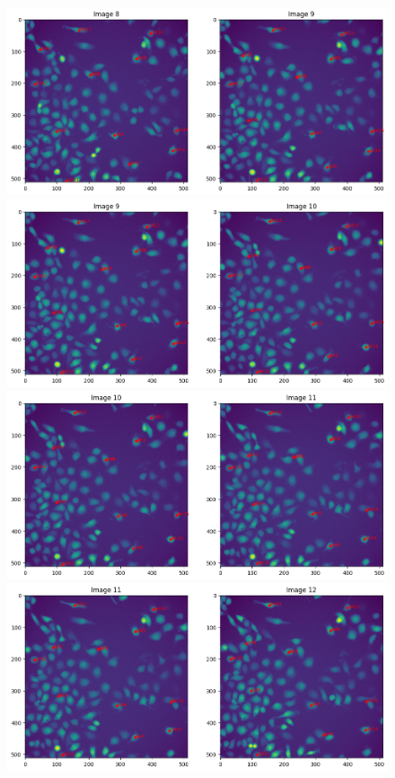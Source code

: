 \documentclass{article}
\begin{document}
\begin{figure}[h!]
\centering
\includegraphics[width=0.75\linewidth]{Report/RImages/Traces_Control/image_9a.png}
\includegraphics[width=0.75\linewidth]{Report/RImages/Traces_Control/image_10a.png}
\includegraphics[width=0.75\linewidth]{Report/RImages/Traces_Control/image_11a.png}
\includegraphics[width=0.75\linewidth]{Report/RImages/Traces_Control/image_12a.png}
\end{figure}

\clearpage
\end{document}
